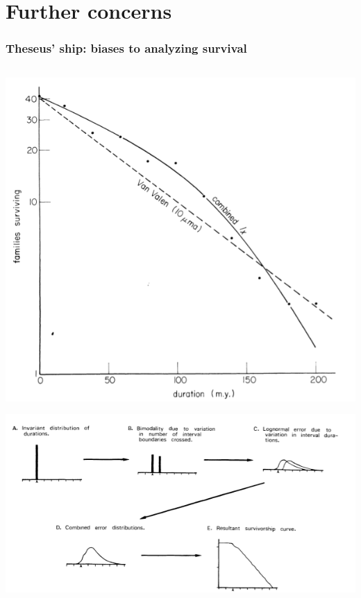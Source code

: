 \documentclass{beamer}
\begin{document}
\appendix
\section{Further concerns}

\begin{frame}
  \frametitle{Theseus' ship: biases to analyzing survival}

  \begin{columns}
    \begin{column}{0.5\textwidth}
      \begin{center}
        \includegraphics[height = 0.4\textheight, width = \textwidth, keepaspectratio = true]{figure/raup}

        \tiny{}

        \includegraphics[height = 0.4\textheight, width = \textwidth, keepaspectratio = true]{figure/sepkoski}


\end{center}
\end{column}
\end{columns}
\end{frame}
\end{document}
